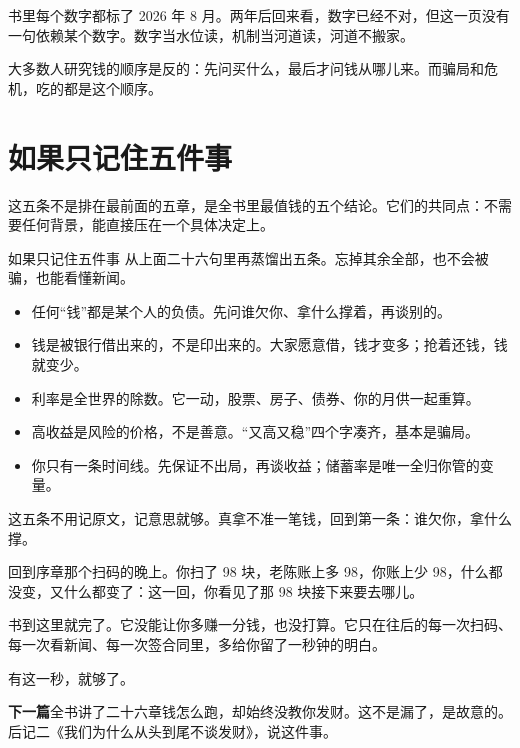 \begin{flowlist}
\end{flowlist}

书里每个数字都标了 2026 年 8 月。两年后回来看，数字已经不对，但这一页没有一句依赖某个数字。数字当水位读，机制当河道读，河道不搬家。

\begin{pullquote}{}
大多数人研究钱的顺序是反的：先问买什么，最后才问钱从哪儿来。而骗局和危机，吃的都是这个顺序。
\end{pullquote}

\section{如果只记住五件事}

这五条不是排在最前面的五章，是全书里最值钱的五个结论。它们的共同点：不需要任何背景，能直接压在一个具体决定上。

\begin{takeaway}{如果只记住五件事}
从上面二十六句里再蒸馏出五条。忘掉其余全部，也不会被骗，也能看懂新闻。

\begin{itemize}
  \item 任何“钱”都是某个人的负债。先问谁欠你、拿什么撑着，再谈别的。
  \item 钱是被银行借出来的，不是印出来的。大家愿意借，钱才变多；抢着还钱，钱就变少。
  \item 利率是全世界的除数。它一动，股票、房子、债券、你的月供一起重算。
  \item 高收益是风险的价格，不是善意。“又高又稳”四个字凑齐，基本是骗局。
  \item 你只有一条时间线。先保证不出局，再谈收益；储蓄率是唯一全归你管的变量。
\end{itemize}

\end{takeaway}

这五条不用记原文，记意思就够。真拿不准一笔钱，回到第一条：谁欠你，拿什么撑。

回到序章那个扫码的晚上。你扫了 98 块，老陈账上多 98，你账上少 98，什么都没变，又什么都变了：这一回，你看见了那 98 块接下来要去哪儿。

书到这里就完了。它没能让你多赚一分钱，也没打算。它只在往后的每一次扫码、每一次看新闻、每一次签合同里，多给你留了一秒钟的明白。

有这一秒，就够了。

\begin{bridgebox}
\textbf{下一篇}全书讲了二十六章钱怎么跑，却始终没教你发财。这不是漏了，是故意的。后记二《我们为什么从头到尾不谈发财》，说这件事。
\end{bridgebox}

